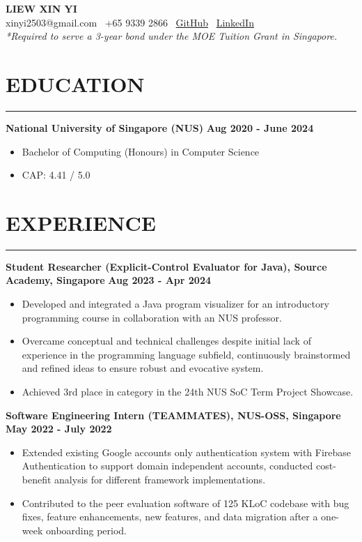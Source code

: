 \documentclass{article}
\begin{document}
\begin{center}
    \textbf{\huge LIEW XIN YI} \\

    xinyi2503@gmail.com \textbar\
    +65 9339 2866 \textbar\
    \href{https://github.com/xyliew25}{GitHub} \textbar\
    \href{https://linkedin.com/in/xyliew}{LinkedIn} \\

    \emph{*Required to serve a 3-year bond under the MOE Tuition Grant in Singapore.}
\end{center}

\section*{EDUCATION}
\vspace{-12pt}
\rule{\textwidth}{3pt}
\textbf{National University of Singapore (NUS)} \hfill \textbf{Aug 2020 - June 2024}
\begin{itemize}
    \item Bachelor of Computing (Honours) in Computer Science
    \item CAP: 4.41 / 5.0
\end{itemize}

\section*{EXPERIENCE}
\vspace{-12pt}
\rule{\textwidth}{3pt}
\textbf{Student Researcher (Explicit-Control Evaluator for Java), Source Academy, Singapore}
\hfill \textbf{Aug 2023 - Apr 2024}
\begin{itemize}
    \item Developed and integrated a Java program visualizer for
    an introductory programming course in collaboration with an NUS professor.
    \item Overcame conceptual and technical challenges despite initial lack of experience
    in the programming language subfield, continuously brainstormed and refined ideas
    to ensure robust and evocative system.
    \item Achieved 3rd place in category in the 24th NUS SoC Term Project Showcase.
\end{itemize}

\noindent \textbf{Software Engineering Intern (TEAMMATES), NUS-OSS, Singapore}
\hfill \textbf{May 2022 - July 2022}
\begin{itemize}
    \item Extended existing Google accounts only authentication system with
    Firebase Authentication to support domain independent accounts,
    conducted cost-benefit analysis for different framework implementations.
    \item Contributed to the peer evaluation software of 125 KLoC codebase with bug fixes,
    feature enhancements, new features, and data migration after a one-week onboarding period.
\end{itemize}
\end{document}
